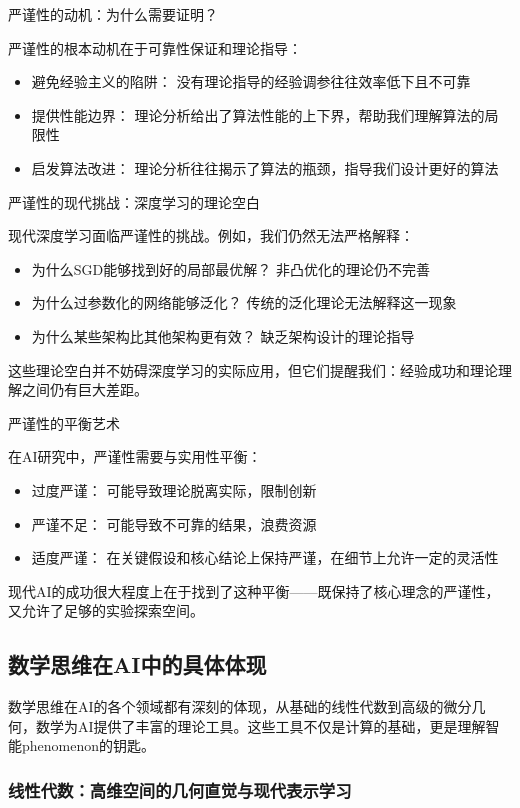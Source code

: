 严谨性的动机：为什么需要证明？

严谨性的根本动机在于可靠性保证和理论指导：

\begin{itemize}
\item 避免经验主义的陷阱： 没有理论指导的经验调参往往效率低下且不可靠
\item 提供性能边界： 理论分析给出了算法性能的上下界，帮助我们理解算法的局限性
\item 启发算法改进： 理论分析往往揭示了算法的瓶颈，指导我们设计更好的算法
\end{itemize}

严谨性的现代挑战：深度学习的理论空白

现代深度学习面临严谨性的挑战。例如，我们仍然无法严格解释：

\begin{itemize}
\item 为什么SGD能够找到好的局部最优解？ 非凸优化的理论仍不完善
\item 为什么过参数化的网络能够泛化？ 传统的泛化理论无法解释这一现象
\item 为什么某些架构比其他架构更有效？ 缺乏架构设计的理论指导
\end{itemize}

这些理论空白并不妨碍深度学习的实际应用，但它们提醒我们：经验成功和理论理解之间仍有巨大差距。

严谨性的平衡艺术

在AI研究中，严谨性需要与实用性平衡：

\begin{itemize}
\item 过度严谨： 可能导致理论脱离实际，限制创新
\item 严谨不足： 可能导致不可靠的结果，浪费资源
\item 适度严谨： 在关键假设和核心结论上保持严谨，在细节上允许一定的灵活性
\end{itemize}

现代AI的成功很大程度上在于找到了这种平衡——既保持了核心理念的严谨性，又允许了足够的实验探索空间。

\subsection{数学思维在AI中的具体体现}

数学思维在AI的各个领域都有深刻的体现，从基础的线性代数到高级的微分几何，数学为AI提供了丰富的理论工具。这些工具不仅是计算的基础，更是理解智能phenomenon的钥匙。

\subsubsection{线性代数：高维空间的几何直觉与现代表示学习}

